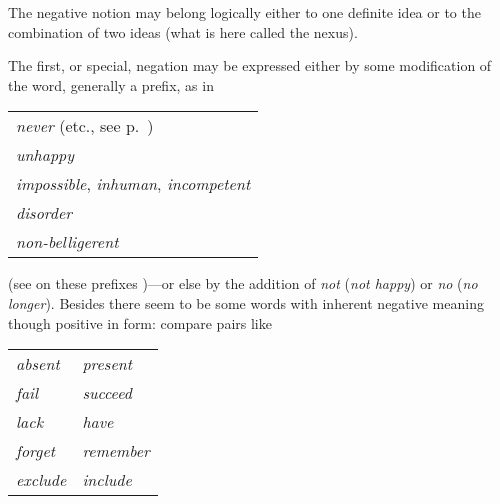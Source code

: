 \label{ch:5}

The negative notion may belong logically either to one definite idea or to the combination of two ideas (what is here called the nexus).

The first, or special, negation may be expressed either by some modification of the word, generally a prefix, as in\label{sec:neg-prefix}

\phantom{a}

\begin{tabular}{@{}l@{}}
\textit{\emph{n}ever} (etc., see p.~\pageref{para:neveretc})\\

\textit{\emph{un}happy}\\

\textit{\emph{im}possible}, \textit{\emph{in}human}, \textit{\emph{in}competent}\\

\textit{\emph{dis}order}\\

\textit{\emph{non}-belligerent}\\
\end{tabular}

\phantom{a}

\noindent (see on these prefixes )---or else by the addition of \textit{not} (\textit{not happy}) or \textit{no} (\textit{no longer}). Besides there seem to be some words with inherent negative meaning though positive in form: compare pairs like 

\phantom{a}

\begin{tabular}{@{}ll@{}}
\textit{absent}& \textit{present}\\

\textit{fail}& \textit{succeed}\\

\textit{lack}& \textit{have}\\

\textit{forget}& \textit{remember}\\

\textit{exclude}& \textit{include}\\
\end{tabular}

